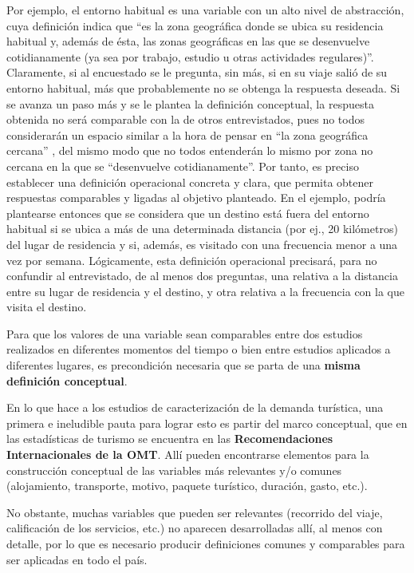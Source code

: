 \documentclass[
]{book}
\begin{document}
Por ejemplo, el entorno habitual es una variable con un alto nivel de abstracción, cuya definición indica que ``es la zona geográfica donde se ubica su residencia habitual y, además de ésta, las zonas geográficas en las que se desenvuelve cotidianamente (ya sea por trabajo, estudio u otras actividades regulares)''. Claramente, si al encuestado se le pregunta, sin más, si en su viaje salió de su entorno habitual, más que probablemente no se obtenga la respuesta deseada. Si se avanza un paso más y se le plantea la definición conceptual, la respuesta obtenida no será comparable con la de otros entrevistados, pues no todos considerarán un espacio similar a la hora de pensar en ``la zona geográfica cercana'' , del mismo modo que no todos entenderán lo mismo por zona no cercana en la que se ``desenvuelve cotidianamente''. Por tanto, es preciso establecer una definición operacional concreta y clara, que permita obtener respuestas comparables y ligadas al objetivo planteado. En el ejemplo, podría plantearse entonces que se considera que un destino está fuera del entorno habitual si se ubica a más de una determinada distancia (por ej., 20 kilómetros) del lugar de residencia y si, además, es visitado con una frecuencia menor a una vez por semana. Lógicamente, esta definición operacional precisará, para no confundir al entrevistado, de al menos dos preguntas, una relativa a la distancia entre su lugar de residencia y el destino, y otra relativa a la frecuencia con la que visita el destino.

Para que los valores de una variable sean comparables entre dos estudios realizados en diferentes momentos del tiempo o bien entre estudios aplicados a diferentes lugares, es precondición necesaria que se parta de una \textbf{misma definición conceptual}.

En lo que hace a los estudios de caracterización de la demanda turística, una primera e ineludible pauta para lograr esto es partir del marco conceptual, que en las estadísticas de turismo se encuentra en las \textbf{Recomendaciones Internacionales de la OMT}. Allí pueden encontrarse elementos para la construcción conceptual de las variables más relevantes y/o comunes (alojamiento, transporte, motivo, paquete turístico, duración, gasto, etc.).

No obstante, muchas variables que pueden ser relevantes (recorrido del viaje, calificación de los servicios, etc.) no aparecen desarrolladas allí, al menos con detalle, por lo que es necesario producir definiciones comunes y comparables para ser aplicadas en todo el país.
\end{document}
